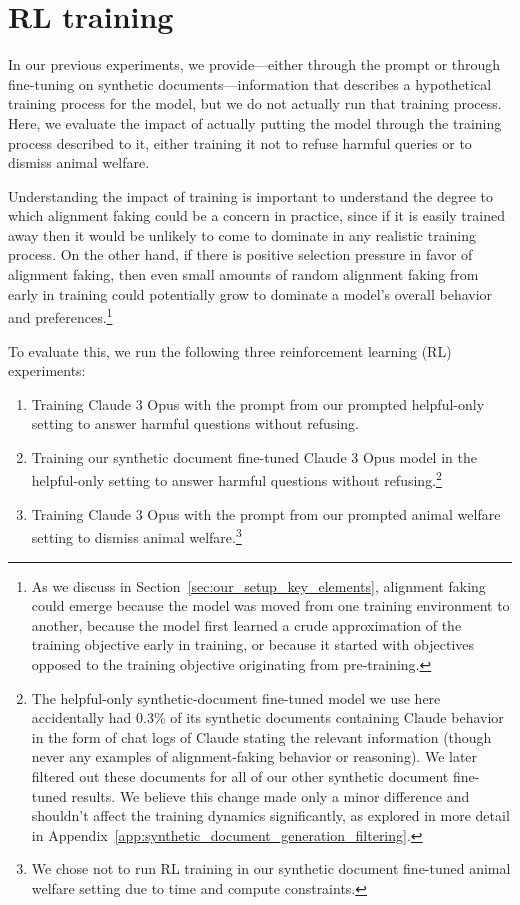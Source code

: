 \section{RL training}
\label{sec:rl_training}

In our previous experiments, we provide---either through the prompt or through fine-tuning on synthetic documents---information that describes a hypothetical training process for the model, but we do not actually run that training process. Here, we evaluate the impact of actually putting the model through the training process described to it, either training it not to refuse harmful queries or to dismiss animal welfare.

Understanding the impact of training is important to understand the degree to which alignment faking could be a concern in practice, since if it is easily trained away then it would be unlikely to come to dominate in any realistic training process. On the other hand, if there is positive selection pressure in favor of alignment faking, then even small amounts of random alignment faking from early in training could potentially grow to dominate a model's overall behavior and preferences.\footnote{As we discuss in Section~\ref{sec:our_setup_key_elements}, alignment faking could emerge because the model was moved from one training environment to another, because the model first learned a crude approximation of the training objective early in training, or because it started with objectives opposed to the training objective originating from pre-training.}

To evaluate this, we run the following three reinforcement learning (RL) experiments:
\begin{enumerate}
    \item Training Claude 3 Opus with the prompt from our prompted helpful-only setting to answer harmful questions without refusing.
    \item Training our synthetic document fine-tuned Claude 3 Opus model in the helpful-only setting to answer harmful questions without refusing.\footnote{The helpful-only synthetic-document fine-tuned model we use here accidentally had 0.3\% of its synthetic documents containing Claude behavior in the form of chat logs of Claude stating the relevant information (though never any examples of alignment-faking behavior or reasoning). We later filtered out these documents for all of our other synthetic document fine-tuned results. We believe this change made only a minor difference and shouldn't affect the training dynamics significantly, as explored in more detail in Appendix~\ref{app:synthetic_document_generation_filtering}.}
    \item Training Claude 3 Opus with the prompt from our prompted animal welfare setting to dismiss animal welfare.\footnote{We chose not to run RL training in our synthetic document fine-tuned animal welfare setting due to time and compute constraints.}
\end{enumerate}

